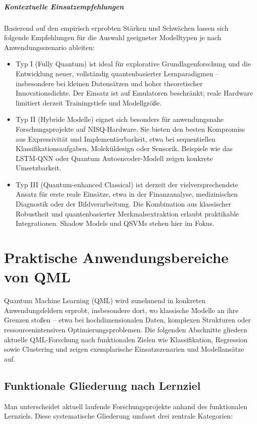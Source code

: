 \subparagraph{Kontextuelle Einsatzempfehlungen}
Basierend auf den empirisch erprobten Stärken und Schwächen lassen sich folgende Empfehlungen für die Auswahl geeigneter Modelltypen je nach Anwendungsszenario ableiten:
\begin{itemize}
  \item Typ I (Fully Quantum) ist ideal für explorative Grundlagenforschung und die Entwicklung neuer, vollständig quantenbasierter Lernparadigmen – insbesondere bei kleinen Datensätzen und hoher theoretischer Innovationsdichte. Der Einsatz ist auf Emulatoren beschränkt; reale Hardware limitiert derzeit Trainingstiefe und Modellgröße.
  \vspace{0.5em}
  \item Typ II (Hybride Modelle) eignet sich besonders für anwendungsnahe Forschungsprojekte auf NISQ-Hardware. Sie bieten den besten Kompromiss aus Expressivität und Implementierbarkeit, etwa bei sequentiellen Klassifikationsaufgaben, Moleküldesign oder Sensorik. Beispiele wie das LSTM-QNN oder Quantum Autoencoder-Modell zeigen konkrete Umsetzbarkeit.
  \vspace{0.5em}
  \item Typ III (Quantum-enhanced Classical) ist derzeit der vielversprechendste Ansatz für erste reale Einsätze, etwa in der Finanzanalyse, medizinischen Diagnostik oder der Bildverarbeitung. Die Kombination aus klassischer Robustheit und quantenbasierter Merkmalsextraktion erlaubt praktikable Integrationen. Shadow Models und QSVMs stehen hier im Fokus.
\end{itemize}



\section{Praktische Anwendungsbereiche von QML}
Quantum Machine Learning (QML) wird zunehmend in konkreten Anwendungsfeldern erprobt, insbesondere dort, wo klassische Modelle an ihre Grenzen stoßen – etwa bei hochdimensionalen Daten, komplexen Strukturen oder ressourcenintensiven Optimierungsproblemen. Die folgenden Abschnitte gliedern aktuelle QML-Forschung nach funktionalen Zielen wie Klassifikation, Regression sowie Clustering und zeigen exemplarische Einsatzszenarien und Modellansätze auf.

\subsection{Funktionale Gliederung nach Lernziel}
Man unterscheidet aktuell laufende Forschungsprojekte anhand des funktionalen Lernziels. Diese systematische Gliederung umfasst drei zentrale Kategorien:
\vspace{0.3cm}

